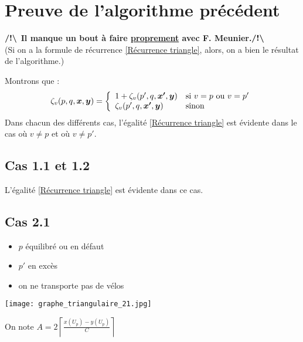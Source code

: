 \section{Preuve de l'algorithme précédent}

\textbf{$\boldsymbol{/!\backslash}$ Il manque un bout à faire \underline{proprement} avec F. Meunier.$\boldsymbol{/!\backslash}$}\\ (Si on a la formule de récurrence \ref{Récurrence triangle}, alors, on a bien le résultat de l'algorithme.)

Montrons que :
\begin{gather} \label{Récurrence triangle}
  \zeta_v(p,q,\boldsymbol{x},\boldsymbol{y}) = \left\{
  \begin{array}{ll}
    1+\zeta_v(p',q,\boldsymbol{x'},\boldsymbol{y}) & \mbox{si } v=p \mbox{ ou } v=p' \\
    \zeta_v(p',q,\boldsymbol{x'},\boldsymbol{y}) & \mbox{sinon}
  \end{array}
  \right.
\end{gather}
Dans chacun des différents cas, l'égalité \ref{Récurrence triangle} est évidente dans le cas où $v \ne p$ et où $v \ne p'$.

\subsection*{Cas 1.1 et 1.2}

L'égalité \ref{Récurrence triangle} est évidente dans ce cas.

\subsection*{Cas 2.1}

\begin{minipage}{0.5\linewidth}
\begin{itemize}
\item $p$ équilibré ou en défaut
\item $p'$ en excès
\item on ne transporte pas de vélos
\end{itemize}
\end{minipage}
\begin{minipage}{0.5\linewidth}
\begin{center}
\texttt{[image: graphe\_triangulaire\_21.jpg]}
\end{center}
\end{minipage}

On note $A = 2 \left\lceil \frac{\displaystyle x(U_p)-y(U_p)}{\displaystyle C} \right\rceil$

